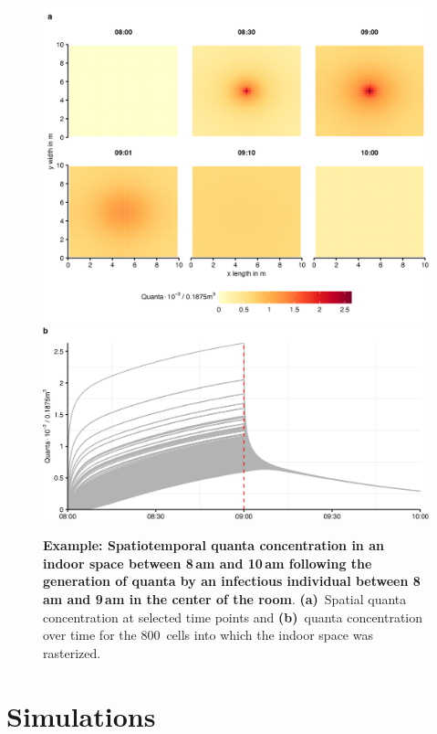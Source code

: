 \documentclass[fleqn,11pt]{wlscirep_supp}
\begin{document}
\begin{figure}[!htpb]
    \centering
    \includegraphics{tests/stm_v2-toy_example-A.png}
    \includegraphics{tests/stm_v2-toy_example-B.png}
    \caption[Example: Spatiotemporal quanta concentration in an indoor space]{\textbf{Example: Spatiotemporal quanta concentration in an indoor space between 8\,am and 10\,am following the generation of quanta by an infectious individual between 8\,am and 9\,am in the center of the room}. \textbf{(a)}~Spatial quanta concentration at selected time points and \textbf{(b)}~quanta concentration over time for the 800~cells into which the indoor space was rasterized.}
    \label{fig:toy-example}
\end{figure}

\clearpage


\section{Simulations}\label{sec:estimation}
\end{document}
